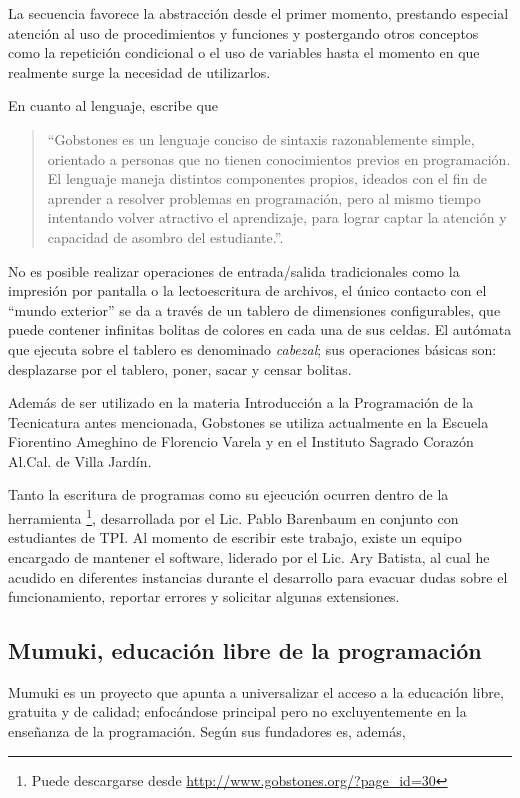 La secuencia favorece la abstracción desde el primer momento, prestando especial atención al uso de procedimientos y funciones y postergando otros conceptos como la repetición condicional o el uso de variables hasta el momento en que realmente surge la necesidad de utilizarlos.

En cuanto al lenguaje, escribe que

\begin{quote}
``Gobstones es un lenguaje conciso de sintaxis razonablemente simple, orientado a personas que no tienen conocimientos previos en programación. El lenguaje maneja distintos componentes propios, ideados con el fin de aprender a resolver problemas en programación, pero al mismo tiempo intentando volver atractivo el aprendizaje, para lograr captar la atención y capacidad de asombro del estudiante.''\cite{LibroGobstones}.
\end{quote}

No es posible realizar operaciones de entrada/salida tradicionales como la impresión por pantalla o la lectoescritura de archivos, el único contacto con el ``mundo exterior'' se da a través de un tablero de dimensiones configurables, que puede contener infinitas bolitas de colores en cada una de sus celdas. El autómata que ejecuta sobre el tablero es denominado \textit{cabezal}; sus operaciones básicas son: desplazarse por el tablero, poner, sacar y censar bolitas.

Además de ser utilizado en la materia Introducción a la Programación de la Tecnicatura antes mencionada, Gobstones se utiliza actualmente en la Escuela Fiorentino Ameghino de Florencio Varela y en el Instituto Sagrado Corazón Al.Cal. de Villa Jardín.

Tanto la escritura de programas como su ejecución ocurren dentro de la herramienta \footnote{Puede descargarse desde \url{http://www.gobstones.org/?page_id=30}}, desarrollada por el Lic. Pablo Barenbaum en conjunto con estudiantes de TPI. Al momento de escribir este trabajo, existe un equipo encargado de mantener el software, liderado por el Lic. Ary Batista, al cual he acudido en diferentes instancias durante el desarrollo para evacuar dudas sobre el funcionamiento, reportar errores y solicitar algunas extensiones.

\subsection{Mumuki, educación libre de la programación}
Mumuki es un proyecto que apunta a universalizar el acceso a la educación libre, gratuita y de calidad; enfocándose principal pero no excluyentemente en la enseñanza de la programación. Según sus fundadores es, además,

